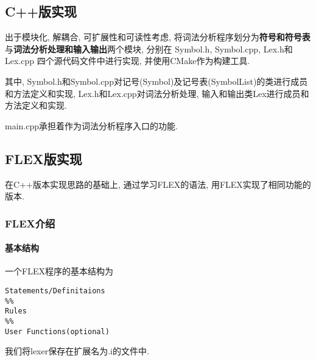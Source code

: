 \subsection{C++版实现}
出于模块化, 解耦合, 可扩展性和可读性考虑, 将词法分析程序划分为\textbf{符号和符号表}
与\textbf{词法分析处理和输入输出}两个模块, 分别在 Symbol.h, Symbol.cpp, Lex.h和Lex.cpp
四个源代码文件中进行实现, 并使用CMake作为构建工具.

其中, Symbol.h和Symbol.cpp对记号(Symbol)及记号表(SymbolList)的类进行成员和方法定义和实现,
Lex.h和Lex.cpp对词法分析处理, 输入和输出类Lex进行成员和方法定义和实现.

main.cpp承担着作为词法分析程序入口的功能.

% 
% 
% 
% 
% 
%
\subsection{FLEX版实现}
在C++版本实现思路的基础上, 通过学习FLEX的语法, 用FLEX实现了相同功能的版本.
\subsubsection{FLEX介绍}
\paragraph{基本结构}
一个FLEX程序的基本结构为
\begin{lstlisting}
Statements/Definitaions
%%
Rules
%%
User Functions(optional)
\end{lstlisting}
我们将lexer保存在扩展名为.i的文件中.

